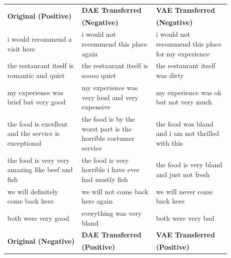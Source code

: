 \begin{table}[ht]
	\centering
	\begin{tabular}{| p{0.3\linewidth} | p{0.3\linewidth} | p{0.3\linewidth} |}
		\hline
		\multirow{2}{*}{\textbf{Original (Positive)}}          & \textbf{DAE Transferred}                                       & \textbf{VAE Transferred}                                    \\
		                                                       & \textbf{(Negative)}                                            & \textbf{(Negative)}                                         \\
		\hline
		i would recommend a visit here                         & i would not recommend this place again                         & i would not recommend this place for my experience          \\
		\hline
		the restaurant itself is romantic and quiet            & the restaurant itself is soooo quiet                           & the restaurant itself was dirty                             \\
		\hline
		my experience was brief but very good                  & my experience was very loud and very expensive                 & my experience was ok but not very much                      \\
		\hline
		the food is excellent and the service is exceptional   & the food is by the worst part is the horrible costumer service & the food was bland and i am not thrilled with this          \\
		\hline
		the food is very very amazing like beef and fish       & the food is very horrible i have ever had mostly fish          & the food is very bland and just not fresh                   \\
		\hline
		we will definitely come back here                      & we will not come back here again                               & we will never come back here                                \\
		\hline
		both were very good                                    & everything was very bland                                      & both were very bad                                          \\
		\hline
		\hline
		\multirow{2}{*}{\textbf{Original (Negative)}}          & \textbf{DAE Transferred}                                       & \textbf{VAE Transferred}                                    \\
		                                                       & \textbf{(Positive)}                                            & \textbf{(Positive)}                                         \\

\end{tabular}
\end{table}

